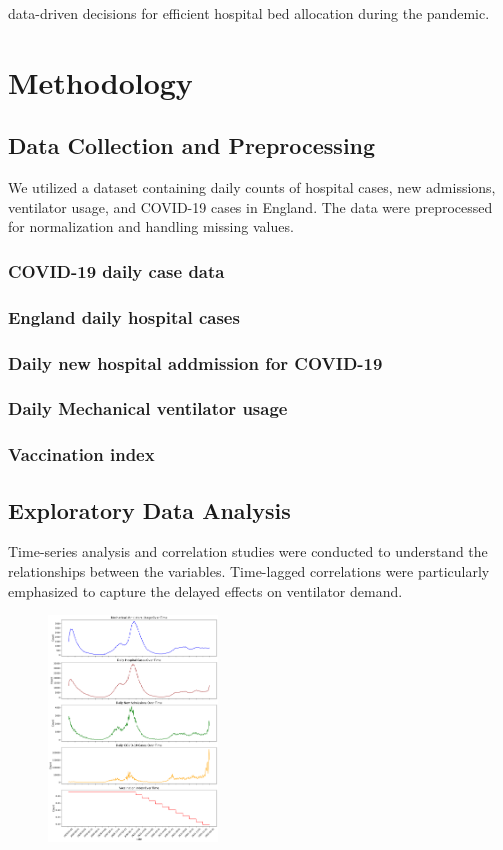 \documentclass[lettersize, journal]{IEEEtran}
\begin{document}
data-driven decisions for efficient hospital bed allocation during the pandemic.

\section{Methodology}
\subsection{Data Collection and Preprocessing}
We utilized a dataset containing daily counts of hospital cases, new admissions, ventilator usage, and COVID-19 cases in England. The data were preprocessed for normalization and handling missing values.

\subsubsection{COVID-19 daily case data}

\subsubsection{England daily hospital cases}

\subsubsection{Daily new hospital addmission for COVID-19}

\subsubsection{Daily Mechanical ventilator usage}

\subsubsection{Vaccination index}

\subsection{Exploratory Data Analysis}
Time-series analysis and correlation studies were conducted to understand the relationships between the variables. Time-lagged correlations were particularly emphasized to capture the delayed effects on ventilator demand.
\IEEEpubidadjcol
\begin{figure}[h]
    \centering
    \includegraphics[width=0.4\textwidth]{"../Research paper/images/trend_analysis_improved.pdf"}
\end{figure}
\end{document}
